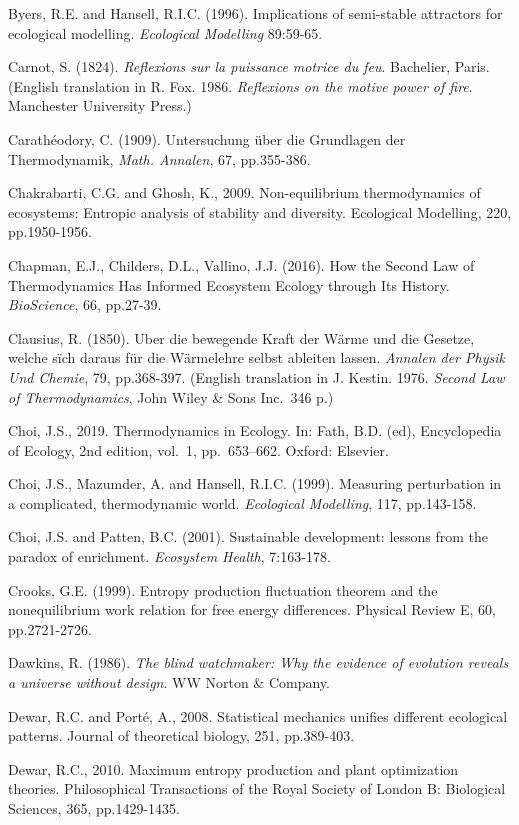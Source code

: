 \documentclass[11pt,letterpaper,]{paper}
\begin{document}
Byers, R.E. and Hansell, R.I.C. (1996). Implications of semi-stable
attractors for ecological modelling. \emph{Ecological Modelling}
89:59-65.

Carnot, S. (1824). \emph{Reflexions sur la puissance motrice du feu}.
Bachelier, Paris. (English translation in R. Fox. 1986. \emph{Reflexions
on the motive power of fire}. Manchester University Press.)

Carathéodory, C. (1909). Untersuchung über die Grundlagen der
Thermodynamik, \emph{Math. Annalen}, 67, pp.355-386.

Chakrabarti, C.G. and Ghosh, K., 2009. Non-equilibrium thermodynamics of
ecosystems: Entropic analysis of stability and diversity. Ecological
Modelling, 220, pp.1950-1956.

Chapman, E.J., Childers, D.L., Vallino, J.J. (2016). How the Second Law
of Thermodynamics Has Informed Ecosystem Ecology through Its History.
\emph{BioScience}, 66, pp.27-39.

Clausius, R. (1850). Uber die bewegende Kraft der Wärme und die Gesetze,
welche sïch daraus für die Wärmelehre selbst ableiten lassen.
\emph{Annalen der Physik Und Chemie}, 79, pp.368-397. (English
translation in J. Kestin. 1976. \emph{Second Law of Thermodynamics},
John Wiley \& Sons Inc.~346 p.)

Choi, J.S., 2019. Thermodynamics in Ecology. In: Fath, B.D. (ed),
Encyclopedia of Ecology, 2nd edition, vol.~1, pp.~653--662. Oxford:
Elsevier.

Choi, J.S., Mazumder, A. and Hansell, R.I.C. (1999). Measuring
perturbation in a complicated, thermodynamic world. \emph{Ecological
Modelling}, 117, pp.143-158.

Choi, J.S. and Patten, B.C. (2001). Sustainable development: lessons
from the paradox of enrichment. \emph{Ecosystem Health}, 7:163-178.

Crooks, G.E. (1999). Entropy production fluctuation theorem and the
nonequilibrium work relation for free energy differences. Physical
Review E, 60, pp.2721-2726.

Dawkins, R. (1986). \emph{The blind watchmaker: Why the evidence of
evolution reveals a universe without design}. WW Norton \& Company.

Dewar, R.C. and Porté, A., 2008. Statistical mechanics unifies different
ecological patterns. Journal of theoretical biology, 251, pp.389-403.

Dewar, R.C., 2010. Maximum entropy production and plant optimization
theories. Philosophical Transactions of the Royal Society of London B:
Biological Sciences, 365, pp.1429-1435.
\end{document}
